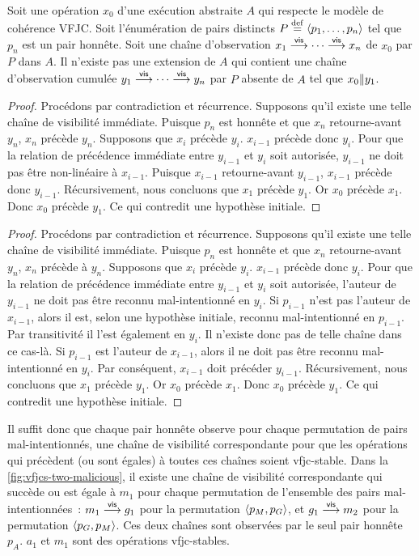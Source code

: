 \begin{proposition}
Soit une opération $x_0$ d'une exécution abstraite $A$ qui respecte le modèle de cohérence \ac{VFJC}.
Soit l'énumération de pairs distincts $P \defeq \tuple*{p_1, \dotsc ,p_n}$ tel que $p_n$ est un pair honnête.
Soit une chaîne d'observation $x_1 \vis \dotsb \vis x_n$ de $x_0$ par $P$ dans $A$.
Il n'existe pas une extension de $A$ qui contient une chaîne d'observation cumulée $y_1 \vis \dotsb \vis y_n$ par $P$ absente de $A$ tel que $x_0 \concur y_1$.
\end{proposition}

\begin{proof}
Procédons par contradiction et récurrence.
Supposons qu'il existe une telle chaîne de visibilité immédiate.
Puisque $p_n$ est honnête et que $x_n$ retourne-avant $y_n$, $x_n$ précède $y_n$.
Supposons que $x_i$ précède $y_i$.
$x_{i-1}$ précède donc $y_i$.
Pour que la relation de précédence immédiate entre $y_{i-1}$ et $y_i$ soit autorisée, $y_{i-1}$ ne doit pas être non-linéaire à $x_{i-1}$.
Puisque $x_{i-1}$ retourne-avant $y_{i-1}$, $x_{i-1}$ précède donc $y_{i-1}$.
Récursivement, nous concluons que $x_1$ précède $y_1$.
Or $x_0$ précède $x_1$.
Donc $x_0$ précède $y_1$.
Ce qui contredit une hypothèse initiale.
\end{proof}

\begin{proof}
Procédons par contradiction et récurrence.
Supposons qu'il existe une telle chaîne de visibilité immédiate.
Puisque $p_n$ est honnête et que $x_n$ retourne-avant $y_n$, $x_n$ précède à $y_n$.
Supposons que $x_i$ précède $y_i$.
$x_{i-1}$ précède donc $y_i$.
Pour que la relation de précédence immédiate entre $y_{i-1}$ et $y_i$ soit autorisée, l'auteur de $y_{i-1}$ ne doit pas être reconnu mal-intentionné en $y_i$.
Si $p_{i-1}$ n'est pas l'auteur de $x_{i-1}$, alors il est, selon une hypothèse initiale, reconnu mal-intentionné en $p_{i-1}$.
Par transitivité il l'est également en $y_i$.
Il n'existe donc pas de telle chaîne dans ce cas-là.
Si $p_{i-1}$ est l'auteur de $x_{i-1}$, alors il ne doit pas être reconnu mal-intentionné en $y_i$.
Par conséquent, $x_{i-1}$ doit précéder $y_{i-1}$.
Récursivement, nous concluons que $x_1$ précède $y_1$.
Or $x_0$ précède $x_1$.
Donc $x_0$ précède $y_1$.
Ce qui contredit une hypothèse initiale.
\end{proof}

Il suffit donc que chaque pair honnête observe pour chaque permutation de pairs mal-intentionnés, une chaîne de visibilité correspondante pour que les opérations qui précèdent (ou sont égales) à toutes ces chaînes soient vfjc-stable.
Dans la \autoref{fig:vfjcs-two-malicious}, il existe une chaîne de visibilité correspondante qui succède ou est égale à $m_1$ pour chaque permutation de l'ensemble des pairs mal-intentionnées~: $m_1 \vis g_1$ pour la permutation $\tuple*{p_M, p_G}$, et $g_1 \vis m_2$ pour la permutation $\tuple*{p_G, p_M}$.
Ces deux chaînes sont observées par le seul pair honnête $p_A$.
$a_1$ et $m_1$ sont des opérations vfjc-stables.

